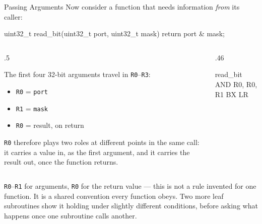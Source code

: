 \documentclass[9pt,aspectratio=169,xcolor=table]{beamer}
\begin{document}
\begin{frame}[fragile]{Passing Arguments}
	\leavevmode
	{\small Now consider a function that needs information \emph{from} its
	caller:}

	\begin{cc}
uint32_t read_bit(uint32_t port, uint32_t mask) {
    return port & mask;
}
	\end{cc}

	\vspace{2mm}
	\begin{columns}[T]
		\begin{column}{.5\textwidth}
			{\small The first four 32-bit arguments travel in \texttt{R0}--\texttt{R3}:
			\begin{itemize}\itemsep1pt
				\item \texttt{R0} = \texttt{port}
				\item \texttt{R1} = \texttt{mask}
				\item \texttt{R0} = result, on return
			\end{itemize}

			\vspace{1mm}
			\texttt{R0} therefore plays two roles at different points in the
			same call: it carries a value \alert{in}, as the first argument,
			and it carries the result \alert{out}, once the function
			returns.}
		\end{column}
		\begin{column}{.46\textwidth}
			\begin{asm}[basicstyle=\small\ttfamily]
read_bit
    AND   R0, R0, R1
    BX    LR
			\end{asm}
		\end{column}
	\end{columns}

	\vspace{2mm}
	{\small \texttt{R0}--\texttt{R1} for arguments, \texttt{R0} for the return
	value --- this is not a rule invented for one function. It is a shared
	convention every function obeys. Two more leaf subroutines show it holding
	under slightly different conditions, before asking what happens once one
	subroutine calls another.}
\end{frame}
\end{document}
